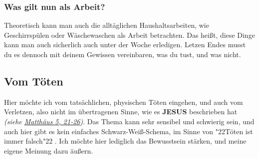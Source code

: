 \documentclass[10pt,a5paper]{article}
\newcommand{\Jesus}[0]{\textbf{JESUS}}
\newcommand{\q}[1]{\char"22{#1}\char"22 }
\begin{document}
	\subsubsection{Was gilt nun als Arbeit?}
		Theoretisch kann man auch die allt\"aglichen Haushaltsarbeiten,
		wie Geschirrsp\"ulen oder W\"aschewaschen als Arbeit betrachten.
		Das hei{\ss}t,
		diese Dinge kann man auch sicherlich auch unter der Woche erledigen.
		Letzen Endes musst du es dennoch mit deinem Gewissen vereinbaren,
		was du tust,
		und was nicht.

	\subsection{Vom T\"oten} \label{VomToeten}
		Hier m\"ochte ich vom tats\"achlichen,
		physischen T\"oten eingehen,
		und auch vom Verletzen,
		also nicht im \"ubertragenen Sinne,
		wie es {\Jesus} beschrieben hat
		\textit{(siehe \href{https://www.die-bibel.de/bibeln/online-bibeln/lesen/LU17/MAT.5/Matthäus-5}{Matth\"aus 5, 21-26})}.
		Das Thema kann sehr sensibel und schwierig sein,
		und auch hier gibt es kein einfaches Schwarz-Wei{\ss}-Schema,
		im Sinne von \q{T\"oten ist immer falsch}.
		Ich m\"ochte hier lediglich das Bewusstsein st\"arken,
		und meine eigene Meinung dazu \"au{\ss}ern.
	
\end{document}
